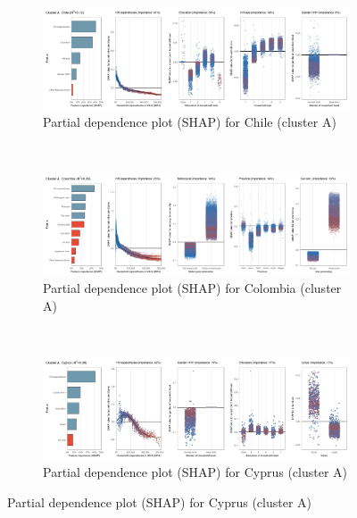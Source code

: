 \begin{figure}[ht!]\ContinuedFloat
    \centering
   \begin{subfigure}[b]{\textwidth}
         \centering
         \caption{Partial dependence plot (SHAP) for Chile (cluster A)}
         \label{fig:5b_CHL}
         \includegraphics[width=\textwidth]{Figure 5b/Figure_5b_CHL}
         \end{subfigure}
    \\
    \vspace{0.5cm}
   \begin{subfigure}[b]{\textwidth}
      \centering
      \caption{Partial dependence plot (SHAP) for Colombia (cluster A)}
      \label{fig:5b_COL}
      \includegraphics[width=\textwidth]{Figure 5b/Figure_5b_COL}       
     \end{subfigure}
    \\
    \vspace{0.5cm}
   \begin{subfigure}[b]{\textwidth}
         \centering
         \caption{Partial dependence plot (SHAP) for Cyprus (cluster A)}
         \label{fig:5b_CYP}
         \includegraphics[width=\textwidth]{Figure 5b/Figure_5b_CYP}
         \end{subfigure}

\end{figure}
